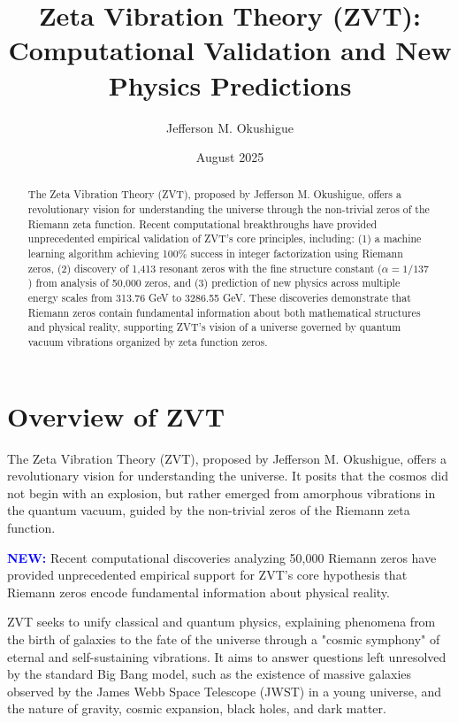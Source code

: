 \documentclass[12pt, a4paper]{article}
\title{Zeta Vibration Theory (ZVT): \\Computational Validation and New Physics Predictions}
\author{Jefferson M. Okushigue}
\date{August 2025}
\begin{document}
\maketitle

\begin{abstract}
The Zeta Vibration Theory (ZVT), proposed by Jefferson M. Okushigue, offers a revolutionary vision for understanding the universe through the non-trivial zeros of the Riemann zeta function. Recent computational breakthroughs have provided unprecedented empirical validation of ZVT's core principles, including: (1) a machine learning algorithm achieving 100\% success in integer factorization using Riemann zeros, (2) discovery of 1,413 resonant zeros with the fine structure constant ($\alpha = 1/137$) from analysis of 50,000 zeros, and (3) prediction of new physics across multiple energy scales from 313.76 GeV to 3286.55 GeV. These discoveries demonstrate that Riemann zeros contain fundamental information about both mathematical structures and physical reality, supporting ZVT's vision of a universe governed by quantum vacuum vibrations organized by zeta function zeros.
\end{abstract}

\tableofcontents
\newpage

\section{Overview of ZVT}
The Zeta Vibration Theory (ZVT), proposed by Jefferson M. Okushigue, offers a revolutionary vision for understanding the universe. It posits that the cosmos did not begin with an explosion, but rather emerged from amorphous vibrations in the quantum vacuum, guided by the non-trivial zeros of the Riemann zeta function.

\textcolor{blue}{\textbf{NEW:}} Recent computational discoveries analyzing 50,000 Riemann zeros have provided unprecedented empirical support for ZVT's core hypothesis that Riemann zeros encode fundamental information about physical reality.

ZVT seeks to unify classical and quantum physics, explaining phenomena from the birth of galaxies to the fate of the universe through a "cosmic symphony" of eternal and self-sustaining vibrations. It aims to answer questions left unresolved by the standard Big Bang model, such as the existence of massive galaxies observed by the James Webb Space Telescope (JWST) in a young universe, and the nature of gravity, cosmic expansion, black holes, and dark matter.
\end{document}

